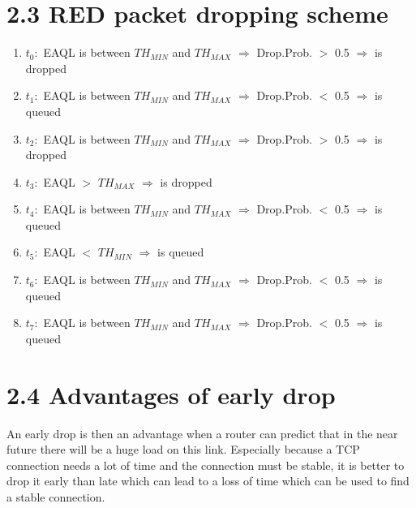 \documentclass{article}
\begin{document}
	\section*{2.3 RED packet dropping scheme}
	\begin{adjustwidth}{2em}{2em}
		\begin{enumerate}[]
			\item $t_0:$ EAQL is between $TH_{MIN}$ and $TH_{MAX}$ $\Rightarrow$ Drop.Prob. $>$ 0.5 $\Rightarrow$ is dropped
			\item $t_1:$ EAQL is between $TH_{MIN}$ and $TH_{MAX}$ $\Rightarrow$ Drop.Prob. $<$ 0.5 $\Rightarrow$ is queued
			\item $t_2:$ EAQL is between $TH_{MIN}$ and $TH_{MAX}$ $\Rightarrow$ Drop.Prob. $>$ 0.5 $\Rightarrow$ is dropped
			\item $t_3:$ EAQL $>$ $TH_{MAX}$ $\Rightarrow$ is dropped
			\item $t_4:$ EAQL is between $TH_{MIN}$ and $TH_{MAX}$ $\Rightarrow$ Drop.Prob. $<$ 0.5 $\Rightarrow$ is queued
			\item $t_5:$ EAQL $<$ $TH_{MIN}$ $\Rightarrow$ is queued
			\item $t_6:$ EAQL is between $TH_{MIN}$ and $TH_{MAX}$ $\Rightarrow$ Drop.Prob. $<$ 0.5 $\Rightarrow$ is queued
			\item $t_7:$ EAQL is between $TH_{MIN}$ and $TH_{MAX}$ $\Rightarrow$ Drop.Prob. $<$ 0.5 $\Rightarrow$ is queued
		\end{enumerate}
	\end{adjustwidth}
	
	\section*{2.4 Advantages of early drop}
	\begin{adjustwidth}{2em}{2em}
		An early drop is then an advantage when a router can predict that in the near future there will be a huge load on this link. Especially because a TCP connection needs a lot of time and the connection must be stable, it is better to drop it early than late which can lead to a loss of time which can be used to find a stable connection. 
	\end{adjustwidth}
	
\end{document}
